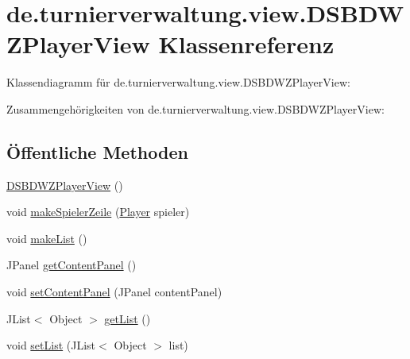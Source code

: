 \hypertarget{classde_1_1turnierverwaltung_1_1view_1_1_d_s_b_d_w_z_player_view}{}\section{de.\+turnierverwaltung.\+view.\+D\+S\+B\+D\+W\+Z\+Player\+View Klassenreferenz}
\label{classde_1_1turnierverwaltung_1_1view_1_1_d_s_b_d_w_z_player_view}


Klassendiagramm für de.\+turnierverwaltung.\+view.\+D\+S\+B\+D\+W\+Z\+Player\+View\+:


Zusammengehörigkeiten von de.\+turnierverwaltung.\+view.\+D\+S\+B\+D\+W\+Z\+Player\+View\+:
\subsection*{Öffentliche Methoden}
\begin{DoxyCompactItemize}
\item 
\hyperlink{classde_1_1turnierverwaltung_1_1view_1_1_d_s_b_d_w_z_player_view_ae386ec230f46546117e5b29c7f9dcf0e}{D\+S\+B\+D\+W\+Z\+Player\+View} ()
\item 
void \hyperlink{classde_1_1turnierverwaltung_1_1view_1_1_d_s_b_d_w_z_player_view_ab862dcd536aade644e6f4aa05bf381de}{make\+Spieler\+Zeile} (\hyperlink{classde_1_1turnierverwaltung_1_1model_1_1_player}{Player} spieler)
\item 
void \hyperlink{classde_1_1turnierverwaltung_1_1view_1_1_d_s_b_d_w_z_player_view_a1fbd1af10e930c202aa3c5395386146a}{make\+List} ()
\item 
J\+Panel \hyperlink{classde_1_1turnierverwaltung_1_1view_1_1_d_s_b_d_w_z_player_view_a8cb1d9877e69112b2cd8afdcfe183b9a}{get\+Content\+Panel} ()
\item 
void \hyperlink{classde_1_1turnierverwaltung_1_1view_1_1_d_s_b_d_w_z_player_view_ac6dd9e0fcdf7454fb88acdf9a1cd1469}{set\+Content\+Panel} (J\+Panel content\+Panel)
\item 
J\+List$<$ Object $>$ \hyperlink{classde_1_1turnierverwaltung_1_1view_1_1_d_s_b_d_w_z_player_view_a6980af8eb2f7c5d254e4a9e28c2676c7}{get\+List} ()
\item 
void \hyperlink{classde_1_1turnierverwaltung_1_1view_1_1_d_s_b_d_w_z_player_view_aa67be3ceba16bf7e11dca312bf54c9a7}{set\+List} (J\+List$<$ Object $>$ list)
\end{DoxyCompactItemize}


